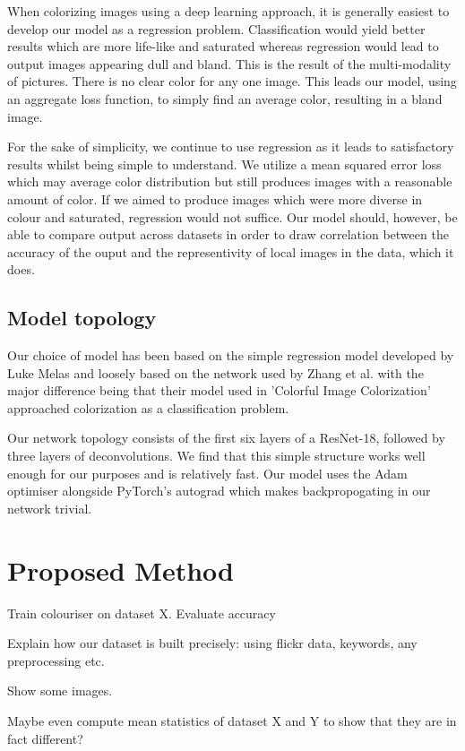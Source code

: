 \documentclass[conference]{IEEEtran}
\begin{document}
When colorizing images using a deep learning approach, it is generally easiest to develop our model as a regression problem. Classification would yield better results which are more life-like and saturated whereas regression would lead to output images appearing dull and bland. This is the result of the multi-modality of pictures. There is no clear color for any one image. This leads our model, using an aggregate loss function, to simply find an average color, resulting in a bland image.

For the sake of simplicity, we continue to use regression as it leads to satisfactory results whilst being simple to understand. We utilize a mean squared error loss which may average color distribution but still produces images with a reasonable amount of color. If we aimed to produce images which were more diverse in colour and saturated, regression would not suffice. Our model should, however, be able to compare output across datasets in order to draw correlation between the accuracy of the ouput and the representivity of local images in the data, which it does.

\subsection{Model topology}

Our choice of model has been based on the simple regression model developed by Luke Melas and loosely based on the network used by Zhang et al. with the major difference being that their model used in 'Colorful Image Colorization' approached colorization as a classification problem.

Our network topology consists of the first six layers of a ResNet-18, followed by three layers of deconvolutions. We find that this simple structure works well enough for our purposes and is relatively fast. Our model uses the Adam optimiser alongside PyTorch's autograd which makes backpropogating in our network trivial.

\section{Proposed Method}

Train colouriser on dataset X. Evaluate accuracy

Explain how our dataset is built precisely: using flickr data, keywords, any preprocessing etc. 

Show some images. 

Maybe even compute mean statistics of dataset X and Y to show that they are in fact different?
\end{document}
